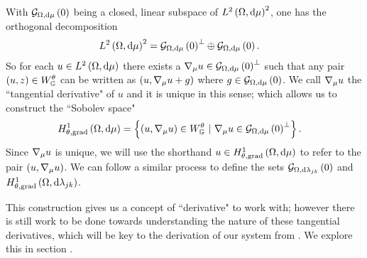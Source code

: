 With $\mathcal{G}_{ \Omega, \mathrm{d}\mu}\left( 0 \right)$ being a closed, linear subspace of $L^{2}\left( \Omega,\mathrm{d}\mu \right)^2$, one has the orthogonal decomposition
\begin{align*}
	L^{2}\left( \Omega,\mathrm{d}\mu \right)^2 &= \mathcal{G}_{ \Omega, \mathrm{d}\mu}\left( 0 \right)^{\perp} \oplus \mathcal{G}_{ \Omega, \mathrm{d}\mu}\left( 0 \right).
\end{align*}
So for each $u\in L^{2}\left( \Omega,\mathrm{d}\mu \right)$ there exists a $\nabla_\mu u\in\mathcal{G}_{ \Omega, \mathrm{d}\mu}\left( 0 \right)^{\perp}$ such that any pair $\left( u,z \right)\in W^{\theta}_{\mathbb{G}}$ can be written as $\left( u,\nabla_\mu u + g \right)$ where $g\in\mathcal{G}_{ \Omega, \mathrm{d}\mu}\left( 0 \right)$.
We call $\nabla_\mu u$ the ``tangential derivative" of $u$ and it is unique in this sense; which allows us to construct the ``Sobolev space"
\begin{align*}
	H^1_{\theta, \mathrm{grad}}\left( \Omega, \mathrm{d}\mu \right) &= \left\{  \left( u, \nabla_\mu u \right)\in W^{\theta}_{\mathbb{G}} \ \vert \ \nabla_\mu u \in \mathcal{G}_{ \Omega, \mathrm{d}\mu}\left( 0 \right)^{\perp}  \right\}.
\end{align*}
Since $\nabla_\mu u$ is unique, we will use the shorthand $u\in H^1_{\theta, \mathrm{grad}}\left( \Omega, \mathrm{d}\mu \right)$ to refer to the pair $\left( u, \nabla_\mu u \right)$. 
We can follow a similar process to define the sets $\mathcal{G}_{ \Omega, \mathrm{d}\lambda_{jk}}\left( 0 \right)$ and $H^1_{\theta, \mathrm{grad}}\left( \Omega, \mathrm{d}\lambda_{jk} \right)$. \newline

This construction gives us a concept of ``derivative" to work with; however there is still work to be done towards understanding the nature of these tangential derivatives, which will be key to the derivation of our system  from .
We explore this in section .
